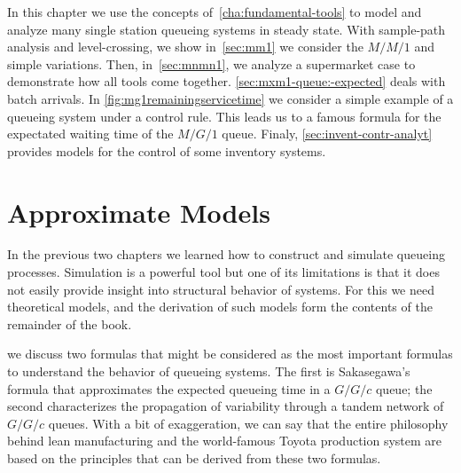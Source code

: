 
In this chapter we use the concepts of~\cref{cha:fundamental-tools} to model and analyze many single station queueing systems in steady state.
With sample-path analysis and level-crossing, we show in~\cref{sec:mm1} we consider the $M/M/1$ and simple variations.
Then, in~\cref{sec:mnmn1}, we analyze a supermarket case to demonstrate how all tools come together.
\cref{sec:mxm1-queue:-expected} deals with batch arrivals.
In \cref{fig:mg1remainingservicetime} we consider a simple example of a queueing system under a control rule.
This leads us to a famous formula for the expectated waiting time of the $M/G/1$ queue. Finaly, \cref{sec:invent-contr-analyt} provides models for the control of some inventory systems.











\chapter{Approximate Models}
\label{cha:approximate-models}


In the previous two chapters we learned how to construct and simulate queueing processes.
Simulation is a powerful tool but one of its limitations is that it does not easily provide insight into structural behavior of systems.
For this we need theoretical models, and the derivation of such models form the contents of the remainder of the book.


 we discuss two formulas that might be considered as the most important formulas to understand the behavior of queueing systems.
The first is Sakasegawa's formula that approximates the expected queueing time in a $G/G/c$ queue; the second characterizes the propagation of variability through a tandem network of $G/G/c$ queues.
With a bit of exaggeration, we can  say that the entire philosophy behind lean manufacturing and the world-famous Toyota production system are based on the principles that can be derived from these two formulas.

